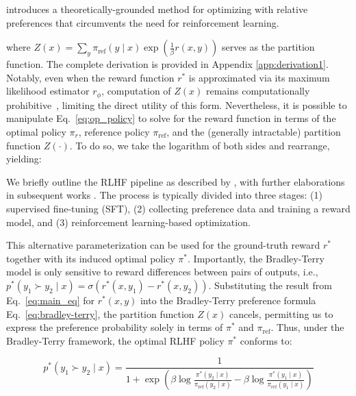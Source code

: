 introduces a theoretically-grounded method for optimizing with relative preferences that circumvents the need for reinforcement learning.

where $Z(x) =\sum_{y}\pi_\text{ref}(y\mid x)\exp\left(\frac{1}{\beta}r(x, y)\right)$ serves as the partition function. The complete derivation is provided in Appendix \ref{app:derivation1}. Notably, even when the reward function $r^*$ is approximated via its maximum likelihood estimator $r_{\phi}$, computation of $Z(x)$ remains computationally prohibitive~\citep{korbak2022reinforcement, go2023aligning}, limiting the direct utility of this form. Nevertheless, it is possible to manipulate Eq.~\ref{eq:op_policy} to solve for the reward function in terms of the optimal policy $\pi_r$, reference policy $\pi_\text{ref}$, and the (generally intractable) partition function $Z(\cdot)$. To do so, we take the logarithm of both sides and rearrange, yielding:

We briefly outline the RLHF pipeline as described by \citeauthor{ziegler2020finetuning}, with further elaborations in subsequent works \citep{stiennon2022learning, bai2022training, ouyang2022training}. The process is typically divided into three stages: (1) supervised fine-tuning (SFT), (2) collecting preference data and training a reward model, and (3) reinforcement learning-based optimization.

This alternative parameterization can be used for the ground-truth reward $r^*$ together with its induced optimal policy $\pi^*$. Importantly, the Bradley-Terry model is only sensitive to reward differences between pairs of outputs, i.e., ${p^*(y_1 \succ y_2 \mid x) = \sigma(r^*(x, y_1) - r^*(x, y_2))}$. Substituting the result from Eq.~\ref{eq:main_eq} for $r^*(x,y)$ into the Bradley-Terry preference formula Eq.~\ref{eq:bradley-terry}, the partition function $Z(x)$ cancels, permitting us to express the preference probability solely in terms of $\pi^*$ and $\pi_\text{ref}$. Thus, under the Bradley-Terry framework, the optimal RLHF policy $\pi^*$ conforms to:

\begin{equation}\label{eq:objective}
    p^*(y_1\succ y_2 \mid x)=\frac{1}{1 + \exp\left(\beta \log \frac{\pi^*(y_2\mid x)}{\pi_\text{ref}(y_2\mid x)} - \beta \log \frac{\pi^*(y_1\mid x)}{\pi_\text{ref}(y_1\mid x)}\right)}
\end{equation}

